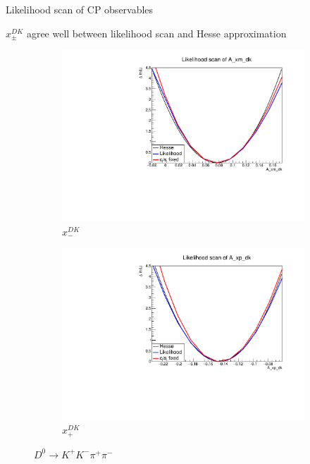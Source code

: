 \documentclass{beamer}
\begin{document}
\begin{frame}{Likelihood scan of CP observables}
  \begin{center}
    $x_\pm^{DK}$ agree well between likelihood scan and Hesse approximation
  \end{center}
  \begin{figure}
    \centering
    \begin{subfigure}{0.5\textwidth}
      \centering
      \includegraphics[width=1.0\textwidth]{Plots/A_xm_dk_likelihood_scan_KKpipi.pdf}
      \vspace{-0.3cm}
      \caption*{$x_-^{DK}$}
    \end{subfigure}%
    \begin{subfigure}{0.5\textwidth}
      \centering
      \includegraphics[width=1.0\textwidth]{Plots/A_xp_dk_likelihood_scan_KKpipi.pdf}
      \vspace{-0.3cm}
      \caption*{$x_+^{DK}$}
    \end{subfigure}
    \caption*{$D^0\to K^+K^-\pi^+\pi^-$}
  \end{figure}
\end{frame}
\end{document}
